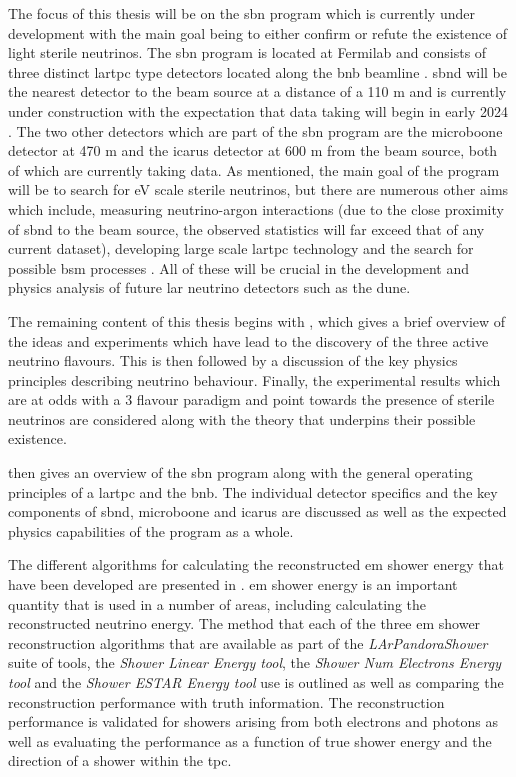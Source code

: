 The focus of this thesis will be on the \gls{sbn} program which is currently under development with the main goal being to either confirm or refute the existence of light sterile neutrinos. The \gls{sbn} program is located at Fermilab and consists of three distinct \gls{lartpc} type detectors located along the \gls{bnb} beamline \cite{SBN_Proposal}. \gls{sbnd} will be the nearest detector to the beam source at a distance of a 110 m and is currently under construction with the expectation that data taking will begin in early 2024 \cite{sbnd_timeline}. The two other detectors which are part of the \gls{sbn} program are the \gls{microboone} detector at 470 m and the \gls{icarus} detector at 600 m from the beam source, both of which are currently taking data. As mentioned, the main goal of the program will be to search for eV scale sterile neutrinos, but there are numerous other aims which include, measuring neutrino-argon interactions (due to the close proximity of \gls{sbnd} to the beam source, the observed statistics will far exceed that of any current dataset), developing large scale \gls{lartpc} technology and the search for possible \gls{bsm} processes \cite{SBN_paper}. All of these will be crucial in the development and physics analysis of future \gls{lar} neutrino detectors such as the \gls{dune}. 

The remaining content of this thesis begins with , which gives a brief overview of the ideas and experiments which have lead to the discovery of the three active neutrino flavours. This is then followed by a discussion of the key physics principles describing neutrino behaviour. Finally, the experimental results which are at odds with a 3 flavour paradigm and point towards the presence of sterile neutrinos are considered along with the theory that underpins their possible existence. 

 then gives an overview of the \gls{sbn} program along with the general operating principles of a \gls{lartpc} and the \gls{bnb}. The individual detector specifics and the key components of \gls{sbnd}, \gls{microboone} and \gls{icarus} are discussed as well as the expected physics capabilities of the program as a whole. 

The different algorithms for calculating the reconstructed \gls{em} shower energy that have been developed are presented in . \gls{em} shower energy is an important quantity that is used in a number of areas, including calculating the reconstructed neutrino energy. The method that each of the three \gls{em} shower reconstruction algorithms that are available as part of the \textit{LArPandoraShower} suite of tools, the \textit{Shower Linear Energy tool}, the \textit{Shower Num Electrons Energy tool} and the \textit{Shower ESTAR Energy tool} use is outlined as well as comparing the reconstruction performance with truth information. The reconstruction performance is validated for showers arising from both electrons and photons as well as evaluating the performance as a function of true shower energy and the direction of a shower within the \gls{tpc}. 

